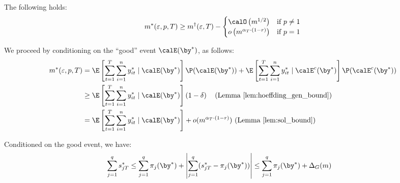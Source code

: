 \documentclass[blindrev]{informs3noheader}
\begin{document}
\begin{lemma}\label{lem:network_deter_stochstic}
The following holds:
\begin{equation*}
m^*(\varepsilon, p,T)
\geq m^\dagger (\varepsilon, T)- \begin{cases}
    \calO\left(m^{1/2}\right) & \text{if }p \neq 1\\
    o\left(m^{\alpha_T\cdot(1-r)}\right) & \text{if }p = 1
\end{cases} 
\end{equation*}
\end{lemma}
We proceed by conditioning on the ``good'' event $\calE(\by^*)$, as follows:
\begin{align*}
m^*(\varepsilon, p,T)
&=\E\left[\sum_{t=1}^T \sum_{i=1}^n  y^*_{it} \mid \calE(\by^*)\right]\P(\calE(\by^*))+\E\left[\sum_{t=1}^T \sum_{i=1}^n  y^*_{it} \mid \calE^c(\by^*)\right]\P(\calE^c(\by^*))\\
&\geq \E\left[\sum_{t=1}^T \sum_{i=1}^n  y^*_{it} \mid \calE(\by^*)\right]\left(1-\delta\right)\quad\text{(Lemma~\ref{lem:hoeffding_gen_bound})}\\
&=\E\left[\sum_{t=1}^T \sum_{i=1}^n  y^*_{it} \mid \calE(\by^*)\right] + o(m^{\alpha_T\cdot(1-r)})\ \text{(Lemma~\ref{lem:sol_bound})}
\end{align*}

Conditioned on the good event, we have:
\begin{align*}
\sum_{j=1}^q s^*_{jT}&\leq \sum_{j=1}^q \pi_{j}(\by^*)+\left|\sum_{j=1}^q (s^*_{jT}-\pi_{j}(\by^*))\right|\leq\sum_{j=1}^q \pi_{j}(\by^*)+\Delta_G(m)
\end{align*}
\end{document}
